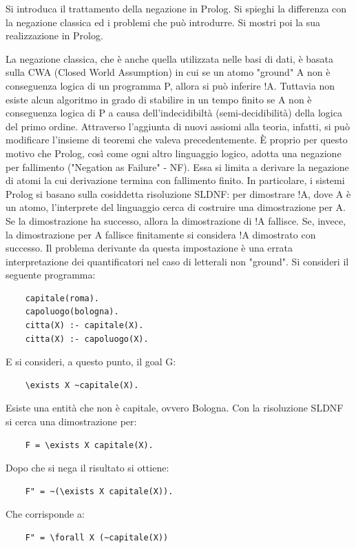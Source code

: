 \documentclass[answers, a4paper, 11pt]{exam}
\begin{document}
\begin{questions}
\question Si introduca il trattamento della negazione in Prolog. Si spieghi la differenza con la negazione
classica ed i problemi che può introdurre. Si mostri poi la sua realizzazione in Prolog.
\begin{solution}
  La negazione classica, che è anche quella utilizzata nelle basi di dati, è basata sulla CWA (Closed World Assumption) in cui se un atomo "ground" A non è conseguenza logica di un programma P, allora si può inferire !A.
  Tuttavia non esiste alcun algoritmo in grado di stabilire in un tempo finito se A non è conseguenza logica di P a causa dell'indecidibiltà (semi-decidibilità) della logica del primo ordine. Attraverso l'aggiunta di nuovi assiomi alla teoria, infatti, si può modificare l'insieme di teoremi che valeva precedentemente.
  È proprio per questo motivo che Prolog, così come ogni altro linguaggio logico, adotta una negazione per fallimento ("Negation as Failure" - NF). Essa si limita a derivare la negazione di atomi la cui derivazione termina con fallimento finito.
  In particolare, i sistemi Prolog si basano sulla cosiddetta risoluzione SLDNF: per dimostrare !A, dove A è un atomo, l'interprete del linguaggio cerca di costruire una dimostrazione per A.
  Se la dimostrazione ha successo, allora la dimostrazione di !A fallisce. Se, invece, la dimostrazione per A fallisce finitamente si considera !A dimostrato con successo.
  Il problema derivante da questa impostazione è una errata interpretazione dei quantificatori nel caso di letterali non "ground".
  Si consideri il seguente programma:
  \begin{verbatim}
    capitale(roma).
    capoluogo(bologna).
    citta(X) :- capitale(X).
    citta(X) :- capoluogo(X).
  \end{verbatim}
  E si consideri, a questo punto, il goal G:
  \begin{verbatim}
    \exists X ~capitale(X).
  \end{verbatim}
  Esiste una entità che non è capitale, ovvero Bologna.
  Con la risoluzione SLDNF si cerca una dimostrazione per:
  \begin{verbatim}
    F = \exists X capitale(X).
  \end{verbatim}
  Dopo che si nega il risultato si ottiene:
  \begin{verbatim}
    F" = ~(\exists X capitale(X)).
  \end{verbatim}
  Che corrisponde a:
  \begin{verbatim}
    F" = \forall X (~capitale(X))
  \end{verbatim}

\end{solution}
\end{questions}
\end{document}
